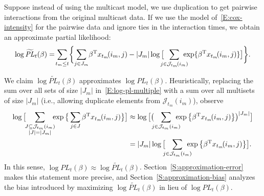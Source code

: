 \documentclass[final]{statsoc}
\begin{document}
Suppose instead of using the multicast model, we use duplication to get
pairwise interactions from the original multicast data.  If we use
the model of~\eqref{E:cox-intensity} for the pairwise data and ignore ties in
the interaction times, we obtain an approximate partial likelihood:
\begin{equation}\label{E:log-pl-multiple-approx}
    \log
    \widetilde{\mathit{PL}}_t(\beta)
        =\!
        \sum_{t_m \leq t}\!
        \bigg\{\!
            \sum_{j \in J_m}\!
                \beta^\trans x_{t_m}\!(i_m, j)
            -
            |J_m|
            \log\big[
                \!\!\!\!
                \sum_{j \in \mathcal{J}_{t_m}\!(i_m)}\!\!\!\!\!
                    \exp\{ \beta^\trans x_{t_m}\!(i_m, j)\}
            \big]
        \bigg\}.
\end{equation}

We claim $\log \widetilde{\mathit{PL}}_t(\beta)$ approximates
$\log \mathit{PL}_t(\beta)$.  Heuristically, replacing the
sum over all sets of size $|J_m|$ in~\eqref{E:log-pl-multiple}
with a sum over all multisets of size $|J_m|$ (i.e., allowing
duplicate elements from $\mathcal{J}_{t_m}(i_m)$), observe
\begin{align*}
    \log\big[\!\!
        \sum_{\substack{J \subseteq \mathcal{J}_{t_m}(i_m) \\
              |J| = |J_m|}}\!\!\!
            \exp\big\{
                \sum_{j \in J}
                    \beta^\trans x_{t_m}\!(i_m, j)
            \big\}
    \big]
    &\approx
        \log\big[
            \big(\!\!\!
            \sum_{j \in \mathcal{J}_{t_m}(i_m)}\!\!\!\!\!
                \exp\big\{
                    \beta^\trans x_{t_m}\!(i_m, j)
                \big\}
        \big)^{|J_m|}
        \big] \\
    &=
        |J_m|
        \log\big[\!\!\!
            \sum_{j \in \mathcal{J}_{t_m}(i_m)}\!\!\!\!\!
                \exp\big\{
                    \beta^\trans x_{t_m}\!(i_m, j)
                \big\}
        \big].
\end{align*}
In this sense,
$\log \mathit{PL}_t(\beta) \approx \log \widetilde{\mathit{PL}}_t(\beta)$.
Section~\ref{S:approximation-error} makes this statement more precise,
and Section~\ref{S:approximation-bias} analyzes the bias introduced by
maximizing $\log \widetilde{\mathit{PL}}_t(\beta)$ in lieu of
$\log \mathit{PL}_t(\beta)$.
\end{document}
